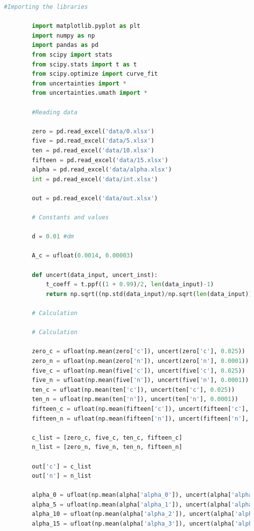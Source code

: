 \documentclass[a4paper,11pt]{article}
\begin{document}
    \begin{lstlisting}[language=Python, basicstyle=\tiny, breaklines=true, postbreak=\mbox{\textbackslashspace}]
        #Importing the libraries

        import matplotlib.pyplot as plt
        import numpy as np
        import pandas as pd
        from scipy import stats
        from scipy.stats import t as t 
        from scipy.optimize import curve_fit
        from uncertainties import *
        from uncertainties.umath import *
        
        #Reading data

        zero = pd.read_excel('data/0.xlsx')
        five = pd.read_excel('data/5.xlsx')
        ten = pd.read_excel('data/10.xlsx')
        fifteen = pd.read_excel('data/15.xlsx')
        alpha = pd.read_excel('data/alpha.xlsx')
        int = pd.read_excel('data/int.xlsx')

        out = pd.read_excel('data/out.xlsx')

        # Constants and values

        d = 0.01 #dm

        A_c = ufloat(0.0014, 0.00003)

        def uncert(data_input, uncert_inst):
            t_coeff = t.ppf((1 + 0.99)/2, len(data_input)-1)
            return np.sqrt((np.std(data_input)/np.sqrt(len(data_input)))**2 + uncert_inst**2)*t_coeff

        # Calculation 

        # Calculation 

        zero_c = ufloat(np.mean(zero['c']), uncert(zero['c'], 0.025))
        zero_n = ufloat(np.mean(zero['n']), uncert(zero['n'], 0.0001))
        five_c = ufloat(np.mean(five['c']), uncert(five['c'], 0.025))
        five_n = ufloat(np.mean(five['n']), uncert(five['n'], 0.0001))
        ten_c = ufloat(np.mean(ten['c']), uncert(ten['c'], 0.025))
        ten_n = ufloat(np.mean(ten['n']), uncert(ten['n'], 0.0001))
        fifteen_c = ufloat(np.mean(fifteen['c']), uncert(fifteen['c'], 0.025))
        fifteen_n = ufloat(np.mean(fifteen['n']), uncert(fifteen['n'], 0.0001))

        c_list = [zero_c, five_c, ten_c, fifteen_c]
        n_list = [zero_n, five_n, ten_n, fifteen_n]

        out['c'] = c_list 
        out['n'] = n_list

        alpha_0 = ufloat(np.mean(alpha['alpha_0']), uncert(alpha['alpha_0'], 0.01))
        alpha_5 = ufloat(np.mean(alpha['alpha_1']), uncert(alpha['alpha_1'], 0.01))
        alpha_10 = ufloat(np.mean(alpha['alpha_2']), uncert(alpha['alpha_2'], 0.01))
        alpha_15 = ufloat(np.mean(alpha['alpha_3']), uncert(alpha['alpha_3'], 0.01))


\end{lstlisting}
\end{document}

